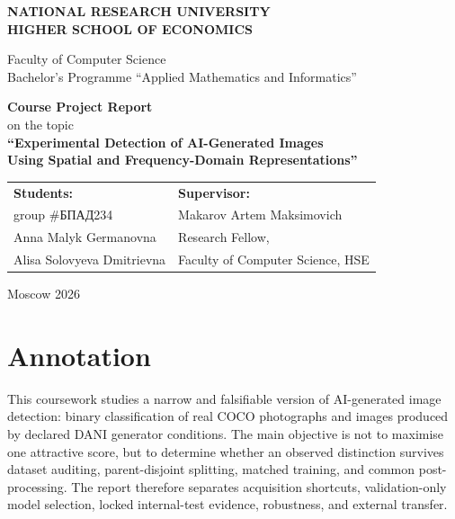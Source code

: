 \documentclass[12pt,a4paper]{article}
\begin{document}
\renewcommand{\contentsname}{Contents}
\renewcommand{\refname}{References}

\begin{titlepage}
\begin{center}
\textbf{NATIONAL RESEARCH UNIVERSITY}\\
\textbf{HIGHER SCHOOL OF ECONOMICS}

\vspace{1.0cm}
Faculty of Computer Science\\
Bachelor's Programme ``Applied Mathematics and Informatics''

\vfill
{\Large\textbf{Course Project Report}}\\[0.5cm]
{\large on the topic}\\[0.5cm]
{\Large\textbf{``Experimental Detection of AI-Generated Images\\
Using Spatial and Frequency-Domain Representations''}}

\vfill
\begin{tabularx}{\textwidth}{@{}Y Y@{}}
\textbf{Students:} & \textbf{Supervisor:}\\[0.3cm]
group \#БПАД234 & Makarov Artem Maksimovich\\
Anna Malyk Germanovna & Research Fellow,\\
Alisa Solovyeva Dmitrievna & Faculty of Computer Science, HSE\\
\end{tabularx}

\vfill
Moscow 2026
\end{center}
\end{titlepage}

\setcounter{page}{2}
\tableofcontents
\clearpage

\section*{Annotation}

This coursework studies a narrow and falsifiable version of AI-generated image detection:
binary classification of real COCO photographs and images produced by declared DANI generator
conditions. The main objective is not to maximise one attractive score, but to determine whether
an observed distinction survives dataset auditing, parent-disjoint splitting, matched training,
and common post-processing. The report therefore separates acquisition shortcuts, validation-only
model selection, locked internal-test evidence, robustness, and external transfer.
\end{document}
